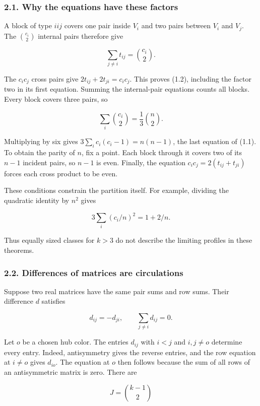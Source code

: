 \documentclass[english,11pt,a4paper]{article}
\begin{document}
\subsubsection{2.1. Why the equations have these factors}\label{why-the-equations-have-these-factors}

A block of type \(iij\) covers one pair inside \(V_i\) and two pairs between \(V_i\) and \(V_j\). The \(\binom{c_i}{2}\) internal pairs therefore give

\[\sum_{j\ne i}t_{ij}=\binom{c_i}{2}.\]

The \(c_ic_j\) cross pairs give \(2t_{ij}+2t_{ji}=c_ic_j\). This proves (1.2), including the factor two in its first equation. Summing the internal-pair equations counts all blocks. Every block covers three pairs, so

\[\sum_i\binom{c_i}{2}=\frac13\binom n2.\]

Multiplying by six gives \(3\sum_i c_i(c_i-1)=n(n-1)\), the last equation of (1.1). To obtain the parity of \(n\), fix a point. Each block through it covers two of its \(n-1\) incident pairs, so \(n-1\) is even. Finally, the equation \(c_ic_j=2(t_{ij}+t_{ji})\) forces each cross product to be even.

These conditions constrain the partition itself. For example, dividing the quadratic identity by \(n^2\) gives

\[3\sum_i(c_i/n)^2=1+2/n.\tag{2.1}\]

Thus equally sized classes for \(k>3\) do not describe the limiting profiles in these theorems.

\subsubsection{2.2. Differences of matrices are circulations}\label{differences-of-matrices-are-circulations}

Suppose two real matrices have the same pair sums and row sums. Their difference \(d\) satisfies

\[d_{ij}=-d_{ji},\qquad \sum_{j\ne i}d_{ij}=0.\tag{2.2}\]

Let \(o\) be a chosen hub color. The entries \(d_{ij}\) with \(i<j\) and \(i,j\ne o\) determine every entry. Indeed, antisymmetry gives the reverse entries, and the row equation at \(i\ne o\) gives \(d_{io}\). The equation at \(o\) then follows because the sum of all rows of an antisymmetric matrix is zero. There are

\[J=\binom{k-1}{2}\]
\end{document}
